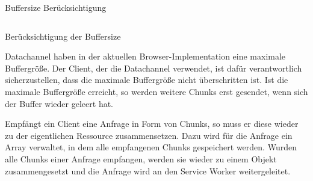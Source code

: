 \begin{description}
\begin{listing}[h]
	\inputminted{javascript}{listings/buffersize.js}
	\caption{Buffersize Berücksichtigung}
	\label{lst:code-buffersize}
\end{listing}
\begin{listing}[h]
	\inputminted{javascript}{listings/handle_chunk.js}
	\caption{Berücksichtigung der Buffersize}
	\label{lst:code-handle-chunk}
\end{listing}

Datachannel haben in der aktuellen Browser-Implementation eine maximale Buffergröße. Der Client, der die Datachannel verwendet, ist dafür verantwortlich sicherzustellen, dass die maximale Buffergröße nicht überschritten ist. Ist die maximale Buffergröße erreicht, so werden weitere Chunks erst gesendet, wenn sich der Buffer wieder geleert hat.

Empfängt ein Client eine Anfrage in Form von Chunks, so muss er diese wieder zu der eigentlichen Ressource zusammensetzen. Dazu wird für die Anfrage ein Array verwaltet, in dem alle empfangenen Chunks gespeichert werden. Wurden alle Chunks einer Anfrage empfangen, werden sie wieder zu einem Objekt zusammengesetzt und die Anfrage wird an den Service Worker weitergeleitet.





\end{description}

